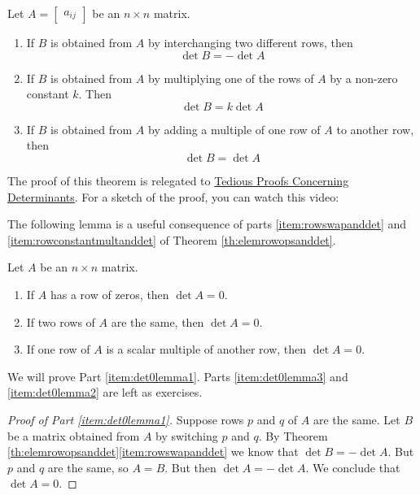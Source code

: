 \documentclass{ximera}
\begin{document}
\begin{theorem}\label{th:elemrowopsanddet}
Let $A=\begin{bmatrix}a_{ij}\end{bmatrix}$ be an $n\times n$ matrix.  
\begin{enumerate}
\item\label{item:rowswapanddet}
If $B$ is obtained from $A$ by interchanging two different rows, then $$\det{B}=-\det{A}$$
\item \label{item:rowconstantmultanddet}
If $B$ is obtained from $A$ by multiplying one of the rows of $A$ by a non-zero constant $k$.  Then $$\det{B}=k\det{A}$$
\item \label{item:addmultotherrowdet}
If $B$ is obtained from $A$ by adding a multiple of one row of $A$ to another row, then
$$\det{B}=\det{A}$$
\end{enumerate}
\end{theorem}
The proof of this theorem is relegated to \href{https://ximera.osu.edu/oerlinalg/LinearAlgebra/DET-0050/main}{Tedious Proofs Concerning Determinants}.  For a sketch of the proof, you can watch this video:

The following lemma is a useful consequence of parts \ref{item:rowswapanddet} and  \ref{item:rowconstantmultanddet} of Theorem \ref{th:elemrowopsanddet}.

\begin{lemma}\label{lemma:det0lemma}
Let $A$ be an $n\times n$ matrix.  
\begin{enumerate}
\item \label{item:det0lemma3} If $A$ has a row of zeros, then $\det{A}=0$.
\item \label{item:det0lemma1} If two rows of $A$ are the same, then $\det{A}=0$.
\item \label{item:det0lemma2} If one row of $A$ is a scalar multiple of another row, then $\det{A}=0$.
\end{enumerate}
\end{lemma}
We will prove Part \ref{item:det0lemma1}.  Parts  \ref{item:det0lemma3} and \ref{item:det0lemma2} are left as exercises.
\begin{proof}[Proof of Part \ref{item:det0lemma1}]
Suppose rows $p$ and $q$ of $A$ are the same.  Let $B$ be a matrix obtained from $A$ by switching $p$ and $q$.  By Theorem \ref{th:elemrowopsanddet}\ref{item:rowswapanddet} we know that $\det{B}=-\det{A}$. But $p$ and $q$ are the same, so $A=B$.  But then
$\det{A}=-\det{A}$.
We conclude that $\det{A}=0$.
\end{proof}
\end{document}
